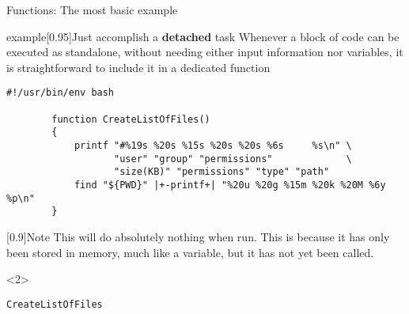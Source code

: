 \begin{frame}[fragile]{Functions: The most basic example}
    \vspace{-5mm}
    \begin{varblock}{example}[0.95\textwidth]{Just accomplish a \textbf{detached} task}
        Whenever a block of code can be executed as standalone, without needing either input information nor variables, it is straightforward to include it in a dedicated function
    \end{varblock}
    \begin{lstlisting}[style=MyBash, xrightmargin=1mm, xleftmargin=1mm]
        #!/usr/bin/env bash

        function CreateListOfFiles()
        {
            printf "#%19s %20s %15s %20s %20s %6s     %s\n" \
                   "user" "group" "permissions"             \
                   "size(KB)" "permissions" "type" "path"
            find "${PWD}" |+-printf+| "%20u %20g %15m %20k %20M %6y     %p\n"
        }
    \end{lstlisting}
    \begin{varblock}{}[0.9\textwidth]{Note}
        This will do absolutely nothing when run. This is because it has only been stored in memory, much like a variable, but it has not yet been called.
    \end{varblock}
    \begin{uncoverenv}<2>
        \begin{lstlisting}[style=MyBash, firstnumber=9, xrightmargin=1mm, xleftmargin=1mm]
            CreateListOfFiles
        \end{lstlisting}
    \end{uncoverenv}
\end{frame}
